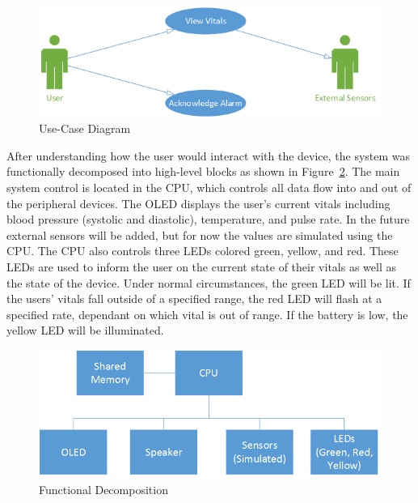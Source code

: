 \documentclass[12pt]{article} %
\begin{document}
\begin{figure}
    \centering
    \includegraphics[width=\textwidth]{../design/use_cases_graphical}
    \caption{Use-Case Diagram}
    \label{fig:use}
\end{figure}

After understanding how the user would interact with the device, the system was
functionally decomposed into high-level blocks as shown in
Figure~\ref{fig:func}.  The main system control is located in the CPU, which
controls all data flow into and out of the peripheral devices.  The OLED
displays the user's current vitals including blood pressure (systolic and
diastolic), temperature, and pulse rate.  In the future external sensors will
be added, but for now the values are simulated using the CPU.  The CPU also
controls three LEDs colored green, yellow, and red.  These LEDs are used to
inform the user on the current state of their vitals as well as the state of
the device.  Under normal circumstances, the green LED will be lit.  If the
users' vitals fall outside of a specified range, the red LED will flash at a
specified rate, dependant on which vital is out of range.  If the battery is
low, the yellow LED will be illuminated.

\begin{figure}[h]
    \centering
    \includegraphics[width=\textwidth]{../design/Functional_decomposition}
    \caption{Functional Decomposition}
    \label{fig:func}
\end{figure}
\end{document}
